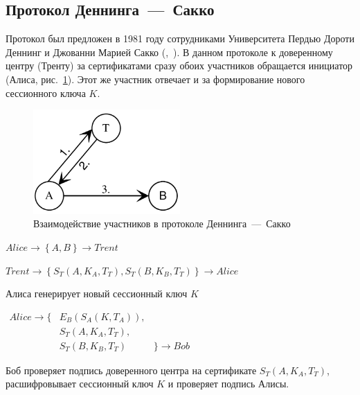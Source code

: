 \subsection{Протокол Деннинга~---~Сакко}

Протокол был предложен в 1981 году сотрудниками Университета Пердью Дороти Деннинг и Джованни Марией Сакко (,~\cite{Denning:Sacco:1981}). В данном протоколе к доверенному центру (Тренту) за сертификатами сразу обоих участников обращается инициатор (Алиса, рис.~\ref{fig:denning-sacco}). Этот же участник отвечает и за формирование нового сессионного ключа $K$.

\begin{figure}
    \centering
    \includegraphics[width=0.5\textwidth]{pic/denning-sacco}
    \caption{Взаимодействие участников в протоколе Деннинга~---~Сакко\label{fig:denning-sacco}}
\end{figure}

\begin{protocol}
    \item[(1)] $Alice \to \left\{ A, B \right\} \to Trent$
    \item[(2)] $Trent \to \left\{ S_T( A, K_A, T_T ), S_T( B, K_B, T_T ) \right\} \to Alice$
	\item[(3)] Алиса генерирует новый сессионный ключ $K$
	\item[{}] $\begin{array}{lll}
Alice \to \{ & E_B( S_A ( K, T_A ) ), & \\ 
             & S_T( A, K_A, T_T ),    & \\ 
             & S_T( B, K_B, T_T )     & \} \to Bob
\end{array}$
	\item[(4)] Боб проверяет подпись доверенного центра на сертификате $S_T( A, K_A, T_T )$, расшифровывает сессионный ключ $K$ и проверяет подпись Алисы.
\end{protocol}

